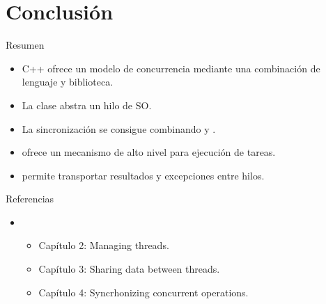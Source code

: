 \section{Conclusión}

\begin{frame}{Resumen}
\begin{itemize}
  \item C++ ofrece un modelo de concurrencia mediante una combinación
        de lenguaje y biblioteca.
  \item La clase  abstra un hilo de SO.
  \item La sincronización se consigue combinando  y .
  \item {} ofrece un mecanismo de alto nivel para ejecución de tareas.
  \item {} permite transportar resultados y excepciones entre hilos.
\end{itemize}
\end{frame}

\begin{frame}[t]{Referencias}
\begin{itemize}
  \item \bibwilliams
    \begin{itemize}
      \item Capítulo 2: Managing threads.
      \item Capítulo 3: Sharing data between threads.
      \item Capítulo 4: Syncrhonizing concurrent operations.
    \end{itemize}
\end{itemize}
\end{frame}
